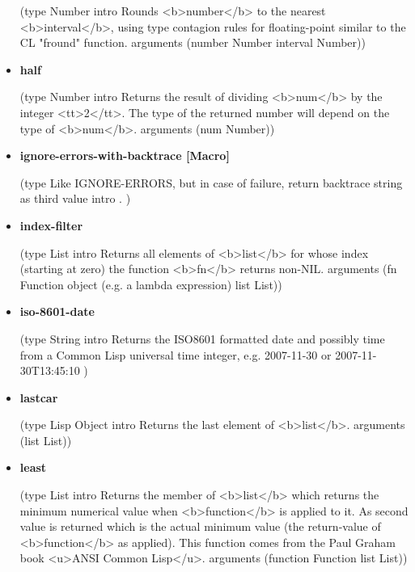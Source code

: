 \documentclass [11pt]{book}
\begin{document}
\begin{itemize}
(type Number intro  Rounds <b>number</b> to the nearest <b>interval</b>,
using type contagion rules for floating-point similar to the
CL "fround" function.
 arguments (number Number interval Number))



\item {}
\label{prim:half}
\textbf{half}

(type Number intro
  Returns the result of dividing <b>num</b> by the integer <tt>2</tt>.
The type of the returned number will depend on the type of <b>num</b>.
 arguments (num Number))



\item {}
\label{prim:ignore-errors-with-backtrace}
\textbf{ignore-errors-with-backtrace [Macro]}

(type
 Like IGNORE-ERRORS, but in case of failure, return backtrace string as third value
 intro .
)



\item {}
\label{prim:index-filter}
\textbf{index-filter}

(type List intro
  Returns all elements of <b>list</b> for whose index (starting at zero) the
function <b>fn</b> returns non-NIL.
 arguments (fn Function object (e.g. a lambda expression) list List))



\item {}
\label{prim:iso-8601-date}
\textbf{iso-8601-date}

(type String intro
  Returns the ISO8601 formatted date and possibly time from a
Common Lisp universal time integer, e.g. 2007-11-30 or
2007-11-30T13:45:10
)



\item {}
\label{prim:lastcar}
\textbf{lastcar}

(type Lisp Object intro  Returns the last element of <b>list</b>.
 arguments (list List))



\item {}
\label{prim:least}
\textbf{least}

(type List intro
  Returns the member of <b>list</b> which returns the minimum numerical value
when <b>function</b> is applied to it. As second value is returned which is the
actual minimum value (the return-value of <b>function</b> as applied). This function
comes from the Paul Graham book <u>ANSI Common Lisp</u>.
 arguments (function Function list List))




\end{itemize}
\end{document}
